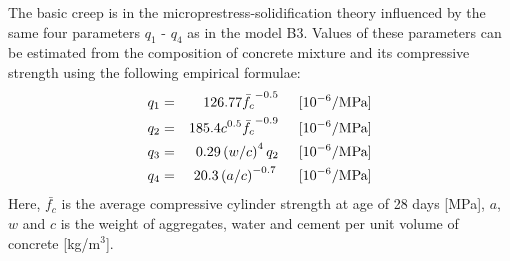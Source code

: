 \documentclass[a4paper]{article}
\begin{document}
The basic creep is in the microprestress-solidification theory influenced by the same four parameters $q_1$ - $q_4$ as in the model B3. Values of these parameters can be estimated from the composition of concrete mixture and its compressive strength using the following empirical formulae: 
\begin{eqnarray}
  q_1 &=& 126.77 \bar{f_c}^{-0.5} \hspace{5 mm} [10^{-6}/\mbox {MPa}]\\
  q_2 &=& 185.4 c^{0.5} \bar{f_c}^{-0.9} \hspace{5 mm} [10^{-6}/\mbox {MPa}]\\
  q_3 &=& 0.29 \left(w/c\right)^4 q_2 \hspace{5 mm} [10^{-6}/\mbox {MPa}]\\
  q_4 &=& 20.3 \left(a/c\right)^{-0.7} \hspace{5 mm} [10^{-6}/\mbox {MPa}]  
\end{eqnarray}
Here, $\bar{f_c}$ is the average compressive cylinder strength at age of 28 days [MPa], $a$, $w$ and $c$ is the weight  of aggregates, water and cement per unit volume of concrete [kg/m$^3$].
\end{document}
